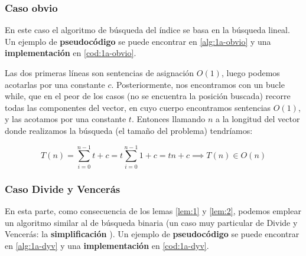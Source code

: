 \subsubsection{Caso obvio} \label{sec:1a-obvio}

En este caso el algoritmo de búsqueda del índice se basa en la búsqueda lineal. Un ejemplo de \textbf{pseudocódigo} 
se puede encontrar en \ref{alg:1a-obvio} y una \textbf{implementación} en \ref{cod:1a-obvio}.





 


Las dos primeras líneas son sentencias de asignación $O(1)$, luego podemos acotarlas por una constante $c$. 
Posteriormente, nos encontramos con un bucle while, que en el peor de los casos (no se encuentra la posición buscada) 
recorre todas las componentes del vector, en cuyo cuerpo encontramos sentencias $O(1)$, y las acotamos por una constante $t$.
Entonces llamando $n$ a la longitud del vector donde realizamos la búsqueda (el tamaño del problema) tendríamos: 


\begin{equation}
    T(n) = \sum_{i=0}^{n-1} t + c = t \sum_{i=0}^{n-1} 1 + c = tn + c \implies \boxed{T(n) \in O(n)}
\end{equation}

\subsubsection{Caso Divide y Vencerás} \label{sec:1a-dyv}

En esta parte, como consecuencia de los lemas \ref{lem:1} y \ref{lem:2}, podemos emplear un 
algoritmo similar al de búsqueda binaria (un caso muy particular de Divide y Vencerás: la
\textbf{simplificación} \cite{Verdegay2017}). Un ejemplo de \textbf{pseudocódigo} se puede encontrar en \ref{alg:1a-dyv} y
una \textbf{implementación} en \ref{cod:1a-dyv}.

